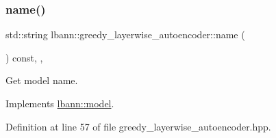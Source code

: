 \mbox{\label{classlbann_1_1greedy__layerwise__autoencoder_a975ea739b9a97e76fac46ce8191dea84}} 
\subsubsection{\texorpdfstring{name()}{name()}}
{\footnotesize\ttfamily std\+::string lbann\+::greedy\+\_\+layerwise\+\_\+autoencoder\+::name (\begin{DoxyParamCaption}{ }\end{DoxyParamCaption}) const\hspace{0.3cm}{\ttfamily [inline]}, {\ttfamily [override]}, {\ttfamily [virtual]}}

Get model name. 

Implements \hyperlink{classlbann_1_1model_a7e471599eded909c4ce7178689dd13b6}{lbann\+::model}.



Definition at line 57 of file greedy\+\_\+layerwise\+\_\+autoencoder.\+hpp.


